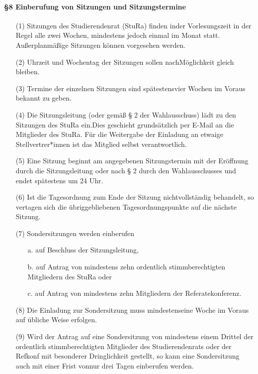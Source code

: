         \paragraph{§8 Einberufung von Sitzungen und Sitzungstermine}
            \begin{itemize}
                \item[(1)] Sitzungen des Studierendenrat (StuRa) finden inder Vorlesungszeit in der Regel alle zwei Wochen, mindestens jedoch einmal im Monat statt. Außerplanmäßige Sitzungen können vorgesehen werden.
                \item[(2)] Uhrzeit und Wochentag der Sitzungen sollen nachMöglichkeit gleich bleiben. 
                \item[(3)] Termine der einzelnen Sitzungen sind spätestensvier Wochen im Voraus bekannt zu geben. 
                \item[(4)] Die Sitzungsleitung (oder gemäß § 2 der Wahlausschuss) lädt zu den Sitzungen des StuRa ein.Dies geschieht grundsätzlich per E-Mail an die Mitglieder des StuRa. Für die Weitergabe der Einladung an etwaige Stellvertrer*innen ist das Mitglied selbst verantwortlich. 
                \item[(5)] Eine Sitzung beginnt am angegebenen Sitzungstermin mit der Eröffnung durch die Sitzungsleitung oder nach § 2 durch den Wahlausschusses und endet spätestens um 24 Uhr. 
                \item[(6)] Ist die Tagesordnung zum Ende der Sitzung nichtvollständig behandelt, so vertagen sich die übriggebliebenen Tagesordnungspunkte auf die nächste Sitzung. 
                \item[(7)] Sondersitzungen werden einberufen
                    \begin{itemize}
                        \item[a.] auf Beschluss der Sitzungsleitung,
                        \item[b.] auf Antrag von mindestens zehn ordentlich stimmberechtigten Mitgliedern des StuRa oder
                        \item[c.] auf Antrag von mindestens zehn Mitgliedern der Referatekonferenz. 
                    \end{itemize}
                \item[(8)] Die Einladung zur Sondersitzung muss mindestenseine Woche im Voraus auf übliche Weise erfolgen.
                \item[(9)] Wird der Antrag auf eine Sondersitzung von mindestens einem Drittel der ordentlich stimmberechtigten Mitglieder des Studierendenrats oder der Refkonf mit besonderer Dringlichkeit gestellt, so kann eine Sondersitzung auch mit einer Frist vonnur drei Tagen einberufen werden. 
            \end{itemize}
